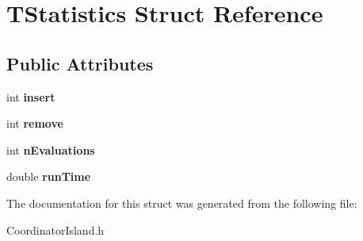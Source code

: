 \hypertarget{structTStatistics}{}\section{T\+Statistics Struct Reference}
\label{structTStatistics}
\subsection*{Public Attributes}
\begin{DoxyCompactItemize}
\item 
\mbox{\label{structTStatistics_a2312a4c3b1f3d54b5b117fcddb284d17}} 
int {\bfseries insert}
\item 
\mbox{\label{structTStatistics_aaa11127265c13875ae843eab94c3ad31}} 
int {\bfseries remove}
\item 
\mbox{\label{structTStatistics_a8a92d03d7ef222fda3be67888394c75b}} 
int {\bfseries n\+Evaluations}
\item 
\mbox{\label{structTStatistics_a46464b1caa6dd08e71b52f845c2b72ee}} 
double {\bfseries run\+Time}
\end{DoxyCompactItemize}


The documentation for this struct was generated from the following file\+:\begin{DoxyCompactItemize}
\item 
Coordinator\+Island.\+h\end{DoxyCompactItemize}
